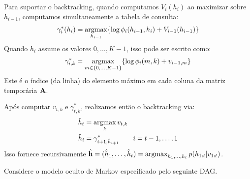 \begin{solution}
    Para suportar o backtracking, quando computamos $V_i(h_i)$ ao maximizar
    sobre $h_{i-1}$, computamos simultaneamente a tabela de consulta:
    \begin{equation}
        \gamma_i^*(h_i)   =  \operatorname*{\mathrm{argmax}}_{h_{i-1}} \{ \log \phi_i(h_{i-1}, h_i) + V_{i-1}(h_{i-1}) \}
    \end{equation}
    Quando $h_i$ assume os valores $0, \ldots, K-1$, isso pode ser escrito como:
    \begin{equation}
        \gamma^*_{i,k} = \operatorname*{\mathrm{argmax}}_{m \in \{0, \ldots, K-1\}} \{ \log \phi_i(m, k) + v_{i-1,m} \}
    \end{equation}
    Este \'e o \'indice (da linha) do elemento m\'aximo em cada coluna da matriz tempor\'aria $\mathbf{A}$.
    
    Ap\'os computar $v_{t,k}$ e $\gamma^*_{t,k}$, realizamos ent\~ao o
    backtracking via:
    \begin{align}
        \hat{h}_t & = \operatorname*{\mathrm{argmax}}_{k}   v_{t,k}\\
        \hat{h}_i & = \gamma^*_{i+1,\hat{h}_{i+1}} \quad \quad i=t-1, \ldots, 1
    \end{align}
    Isso fornece recursivamente $\hat{\mathbf{h}} = (\hat{h}_1, \ldots, \hat{h}_t) = \operatorname*{\mathrm{argmax}}_{h_1, \ldots, h_t}  p(h_{1:t}|v_{1:t})$.
    
\end{solution}


\label{ex:FFBS-alt}

Considere o modelo oculto de Markov especificado pelo seguinte DAG.

